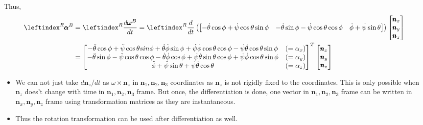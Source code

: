 Thus,
\begin{align*}
     \lx{^R}{\pmb \alpha}^B &= \lx{^R}{\frac{d\pmb \omega^B}{dt}}
     = \lx{^R}{\frac{d}{dt}} \left(\bm{-\dot \theta \cos \phi + \dot \psi \cos \theta \sin \phi &
         -\dot \theta \sin \phi - \dot \psi \cos \theta \cos \phi &
         \dot \phi + \dot \psi \sin \theta }
    \right) \bm{\pmb n_x \\ \pmb n_y \\ \pmb n_z}\\
    &=\bm{
        -\ddot \theta \cos \phi + \ddot \psi \cos \theta sin \phi + \dot \theta \dot \phi \sin \phi + \dot \psi \dot \phi \cos \theta \cos \phi - \dot \psi \dot \theta \cos \theta \sin \phi & (= \alpha_x)\\
        -\ddot \theta \sin \phi - \ddot \psi \cos \theta \cos \phi - \dot \theta \dot \phi \cos \phi + \dot \psi \dot \theta \sin \theta \cos \phi + \dot \psi \dot \phi \cos \theta \sin \phi & (= \alpha_y)\\
        \ddot \phi + \ddot \psi \sin \theta + \dot \psi \dot \theta \cos \theta & (=\alpha_z)
    }^T
    \bm{\pmb n_x \\ \pmb n_y \\ \pmb n_z}\\
\end{align*}

\begin{itemize}
    \item We can not just take $d \pmb n_z/dt$ as $\omega \times \pmb n_z$ in $\pmb n_1, \pmb n_2, \pmb n_3$ coordinates as $\pmb n_z$ is not rigidly fixed to the coordinates. This is only possible when $\pmb n_z$ does't change with time in $\pmb n_1, \pmb n_2, \pmb n_3$ frame. But once, the differentiation is done, one vector in $\pmb n_1, \pmb n_2, \pmb n_3$ frame can be written in $\pmb n_x, \pmb n_y, \pmb n_z$ frame using transformation matrices as they are instantaneous.

    \item Thus the rotation transformation can be used after differentiation as well.
\end{itemize}
